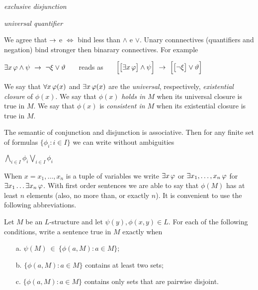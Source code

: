 \emph{exclusive disjunction}

\emph{universal quantifier}\bigskip

We agree that $\rightarrow$ e $\iff$ bind less than $\wedge$ e $\vee$.  Unary connnectives (quantifiers and negation) bind stronger then binarary connectives. For example

\hfil$\E x\,\phi \wedge \psi\ \imp\ \neg\xi\vee\theta$ \ \ \ reads as \ \ \ $\Big[\big[\E x\,\phi\big]\wedge\psi\Big]\ \imp\ \Big[\big[\neg\xi\big]\vee\theta\Big]$

We say that $\forall x\,\varphi(x)$ and $\exists x\,\varphi(x)$ are the \emph{universal}, respectively, \emph{existential closure} of $\phi(x)$. We say that $\phi(x)$ \emph{holds in $M$\/} when its universal closure is true in $M$. We say that $\phi(x)$ is \emph{consistent in $M$\/} when its existential closure is true in $M$.

The semantic of conjunction and disjunction is associative. Then for any finite set of formulas $\{\phi_i:i\in I\}$ we can write without ambiguities 

\hfil \emph{$\displaystyle\bigwedge_{i\in I}\phi_i$}\hfil \emph{$\displaystyle\bigvee_{i\in I}\phi_i$}\bigskip


When $x=x_1,\dots,x_n$ is a tuple of variables we write \emph{$\exists x\,\varphi$\/} or \emph{$\exists x_1,\dots,x_n\,\varphi$\/} for $\exists x_1\dots\exists x_n\,\varphi$.  With first order sentences we are able to say that $\phi(M)$ has at least $n$ elements (also, no more than, or exactly $n$). It is convenient to use the following abbreviations.


\bigskip

\smallskip


\begin{exercise}
Let $M$ be an $L$-structure and let $\psi(y), \phi(x,y)\in L$. For each of the following conditions, write a sentence true in $M$ exactly when
\begin{itemize}
\item[a.] $\psi(M)\ \in\ \big\{\phi(a,M): a\in M\big\}$;
\item[b.] $\big\{\phi(a,M): a\in M\big\}$ contains at least two sets;
\item[c.] $\big\{\phi(a,M): a\in M\big\}$ contains only sets that are pairwise disjoint.\QED
\end{itemize}
\end{exercise}

